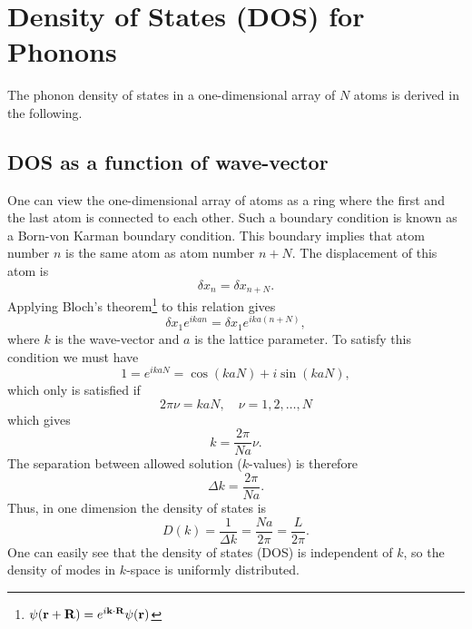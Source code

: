 \documentclass[11pt]{amsart}
\begin{document}

\setcounter{section}{1}
\section{Density of States (DOS) for Phonons}
The phonon density of states in a one-dimensional array of $N$ atoms is derived in the following.

\subsection{DOS as a function of wave-vector}
One can view the one-dimensional array of atoms as a ring where the first and the last atom is connected to each other. Such a boundary condition is known as a Born-von Karman boundary condition. This boundary implies that atom number $n$ is the same atom as atom number $n+N$.
The displacement of this atom is
\begin{equation*}
\delta x_n = \delta x_{n+N}.
\end{equation*}
Applying Bloch's theorem\footnote{$\psi(\vb{r}+\vb{R})=e^{i\vb{k}\cdot\vb{R}}\psi(\vb{r})$}
to this relation gives
\begin{equation*}
\delta x_1 e^{ikan} = \delta x_1 e^{ika(n+N)},
\end{equation*}
where $k$ is the wave-vector and $a$ is the lattice parameter. To satisfy this condition we must have
\begin{equation*}
1 = e^{ikaN} = \cos(kaN) + i\sin(kaN),
\end{equation*}
which only is satisfied if
\begin{equation*}
2\pi\nu = kaN, \quad \nu=1,2,\dots,N
\end{equation*}
which gives
\begin{equation*}
k = \frac{2\pi}{Na}\nu.
\end{equation*}
The separation between allowed solution ($k$-values) is therefore
\begin{equation}
\Delta k = \frac{2\pi}{Na}.
\end{equation}
Thus, in one dimension the density of states is
\begin{equation}
D(k) = \frac{1}{\Delta k} = \frac{Na}{2\pi} = \frac{L}{2\pi}.
\end{equation}
One can easily see that the density of states (DOS) is independent of $k$, so the density of modes in $k$-space is uniformly distributed.
\end{document}
